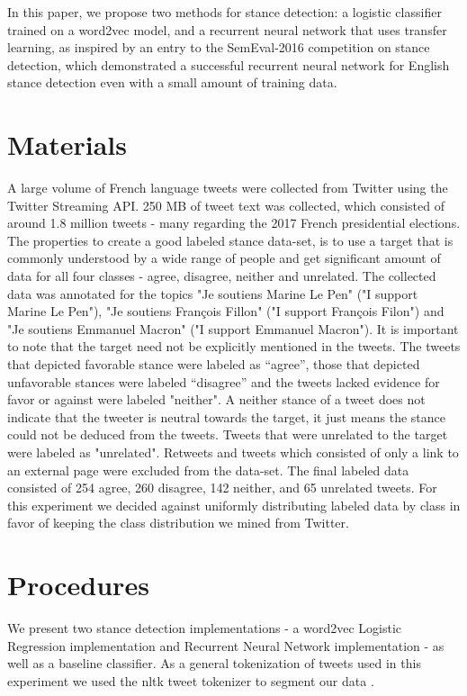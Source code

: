 \documentclass[journal]{IEEEtran}
\begin{document}
In this paper, we propose two methods for stance detection: a logistic classifier trained on a word2vec model, and a recurrent neural network that uses transfer learning, as inspired by an entry \cite{DBLP:journals/corr/ZarrellaM16} to the SemEval-2016 competition on stance detection, which demonstrated a successful recurrent neural network for English stance detection even with a small amount of training data.

\clearpage

\section{Materials}
A large volume of French language tweets were collected from Twitter using the Twitter Streaming API. 250 MB of tweet text was collected, which consisted of around 1.8 million tweets - many regarding the 2017 French presidential elections. The properties to create a good labeled stance data-set, is to use a target that is commonly understood by a wide range of people and get significant amount of data for all four classes - agree, disagree, neither and unrelated. The collected data was annotated for the topics "Je soutiens Marine Le Pen" ("I support Marine Le Pen"), "Je soutiens Fran\c{c}ois Fillon" ("I support Fran\c{c}ois Filon") and "Je soutiens Emmanuel Macron" ("I support Emmanuel Macron"). It is important to note that the target need not be explicitly mentioned in the tweets. The tweets that depicted favorable stance were labeled as “agree”, those that depicted unfavorable stances were labeled “disagree” and the tweets lacked evidence for favor or against were labeled "neither". A neither stance of a tweet does not indicate that the tweeter is neutral towards the target, it just means the stance could not be deduced from the tweets. Tweets that were unrelated to the target were labeled as "unrelated". Retweets and tweets which consisted of only a link to an external page were excluded from the data-set. The final labeled data consisted of 254 agree, 260 disagree, 142 neither, and 65 unrelated tweets. For this experiment we decided against uniformly distributing labeled data by class in favor of keeping the class distribution we mined from Twitter.

\clearpage

\section{Procedures}
We present two stance detection implementations - a word2vec Logistic Regression implementation and Recurrent Neural Network implementation - as well as a baseline classifier. As a general tokenization of tweets used in this experiment we used the nltk tweet tokenizer to segment our data \cite{nltk}. 
\end{document}
